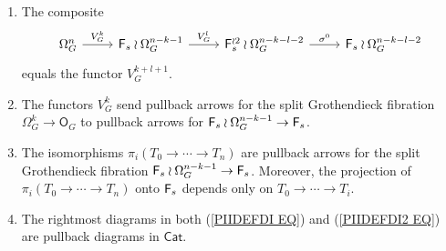 \documentclass[a4paper,10pt]{article}%
\begin{document}
\begin{proposition}\label{PIIPROP PROP}
\begin{enumerate}[label=(\alph*)]
\item The composite
\[
\begin{tikzcd}
	\Omega_G^n \ar{r}{V_G^k} &
	\Fin_s \wr \Omega_G^{n-k-1} \ar{r}{V_G^l} &
	\Fin_s^{\wr 2} \wr \Omega_G^{n-k-l-2} \ar{r}{\sigma^0} &
	\Fin_s \wr \Omega_G^{n-k-l-2}
\end{tikzcd}
\]
equals the functor $V_{G}^{k+l+1}$.

\item The functors $V_G^k$ send pullback arrows for the split Grothendieck fibration $\Omega_G^k \to \mathsf{O}_G$
to pullback arrows for $\mathsf{F}_s \wr \Omega_G^{n-k-1} \to \mathsf{F}_s$.

\item The isomorphisms $\pi_i(T_0 \to \cdots \to T_n)$
are pullback arrows for the split Grothendieck fibration 
$\mathsf{F}_s \wr \Omega_G^{n-k-1} \to \mathsf{F}_s$. Moreover, the projection of $\pi_i(T_0 \to \cdots \to T_n)$ onto $\mathsf{F}_s$
depends only on $T_0 \to \cdots \to T_i$.

\item The rightmost diagrams in both (\ref{PIIDEFDI EQ})
and (\ref{PIIDEFDI2 EQ}) are pullback diagrams in $\mathsf{Cat}$.


\end{enumerate}
\end{proposition}
\end{document}
